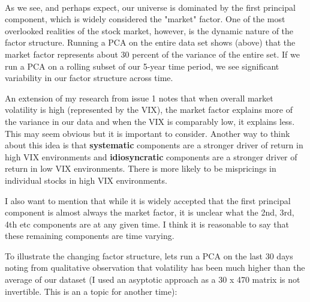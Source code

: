 \documentclass[11pt]{article}
\begin{document}
    \begin{center}
    \end{center}
    { \hspace*{\fill} \\}
    
    As we see, and perhaps expect, our universe is dominated by the first
principal component, which is widely considered the "market" factor. One
of the most overlooked realities of the stock market, however, is the
dynamic nature of the factor structure. Running a PCA on the entire data
set shows (above) that the market factor represents about 30 percent of
the variance of the entire set. If we run a PCA on a rolling subset of
our 5-year time period, we see significant variability in our factor
structure across time.

An extension of my research from issue 1 notes that when overall market
volatility is high (represented by the VIX), the market factor explains
more of the variance in our data and when the VIX is comparably low, it
explains less. This may seem obvious but it is important to consider.
Another way to think about this idea is that \textbf{systematic}
components are a stronger driver of return in high VIX environments and
\textbf{idiosyncratic} components are a stronger driver of return in low
VIX environments. There is more likely to be mispricings in individual
stocks in high VIX environments.

I also want to mention that while it is widely accepted that the first
principal component is almost always the market factor, it is unclear
what the 2nd, 3rd, 4th etc components are at any given time. I think it
is reasonable to say that these remaining components are time varying.

To illustrate the changing factor structure, lets run a PCA on the last
30 days noting from qualitative observation that volatility has been
much higher than the average of our dataset (I used an asyptotic
approach as a 30 x 470 matrix is not invertible. This is an a topic for
another time):
\end{document}

